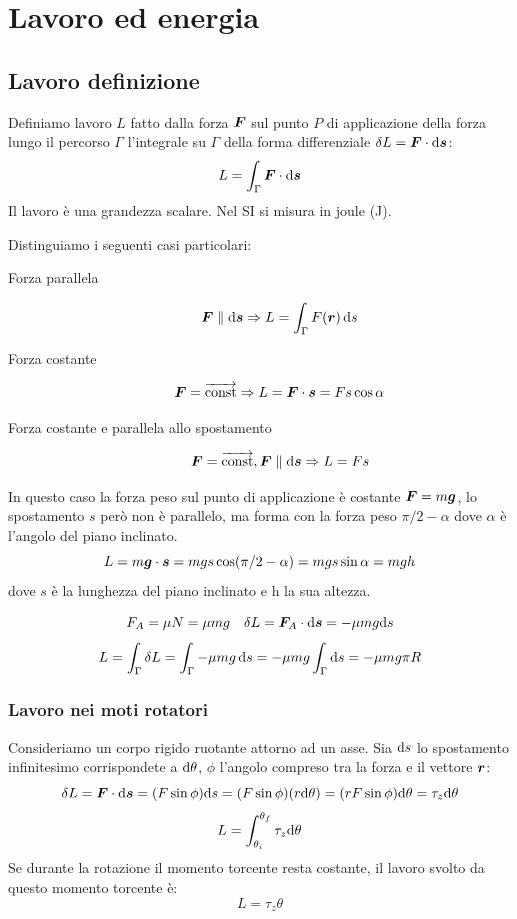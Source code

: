 \chapter{Lavoro ed energia}
\minitoc
\section{Lavoro definizione}
\begin{Def}[lavoro]
  Definiamo lavoro $L$ fatto dalla forza $\boldsymbol{F}$ sul punto $P$ di applicazione della forza lungo il percorso $\Gamma$ l'integrale su $\Gamma$ della forma differenziale $\delta L = \boldsymbol{F}\cdot\mathrm{d}\boldsymbol{s}$:
  \begin{equation}
    L=\int_\Gamma\boldsymbol{F}\cdot\mathrm{d} \boldsymbol{s}
  \end{equation}
  Il lavoro è una grandezza scalare. Nel SI si misura in joule (\si{\joule}).
\end{Def}
Distinguiamo i seguenti casi particolari:
\begin{description}
  \item[Forza parallela]
    \[\boldsymbol{F} \parallel \mathrm{d}\boldsymbol{s}\Rightarrow L=\int_\Gamma F(\boldsymbol{r})\,\mathrm{d} s\]
  \item[Forza costante]
    \[\boldsymbol{F} = \overrightarrow{\text{const}}\Rightarrow L=\boldsymbol{F} \cdot \boldsymbol{s} = Fs\cos\alpha\]
  \item[Forza costante e parallela allo spostamento]
    \[\boldsymbol{F} = \overrightarrow{\text{const}}, \boldsymbol{F} \parallel \mathrm{d}\boldsymbol{s}\Rightarrow L=Fs\]
\end{description}
\begin{Es}
  In questo caso la forza peso sul punto di applicazione è costante $\boldsymbol{F}=m\boldsymbol{g}$, lo spostamento $s$ però non è parallelo, ma forma con la forza peso $\pi/2 -\alpha$ dove $\alpha$ è l'angolo del piano inclinato.
  \[
    L = m\boldsymbol{g} \cdot \boldsymbol{s} = mgs\cos(\pi/2 - \alpha) = mgs\sin\alpha = mgh
  \]
  dove $s$ è la lunghezza del piano inclinato e h la sua altezza.
\end{Es}

\begin{Es}
  \[F_A=\mu N=\mu mg\quad \delta L=\boldsymbol{F}_A\cdot\mathrm{d} \boldsymbol{s}=-\mu mg\mathrm{d} s\]
  \[L=\int_\Gamma \delta L=\int_\Gamma -\mu mg\,\mathrm{d} s=-\mu mg\int_\Gamma\mathrm{d}
    s=-\mu mg\pi R\]
\end{Es}
\subsection{Lavoro nei moti rotatori}
Consideriamo un corpo rigido ruotante attorno ad un asse. Sia $\mathrm{d} s$ lo spostamento
infinitesimo corrispondete a $\mathrm{d} \theta$, $\phi$ l'angolo
compreso tra la forza e il vettore $\boldsymbol{r}$:
\[
  \delta L=\boldsymbol{F}\cdot\mathrm{d}\boldsymbol{s}=(F\sin \phi)\mathrm{d} s=(F \sin \phi)(r
  \mathrm{d}\theta)=(rF\sin\phi)\mathrm{d} \theta=\tau_z\mathrm{d}\theta
\]
\[L=\int_{\theta_i}^{\theta_f}\tau_z\mathrm{d}\theta\]
Se durante la rotazione il momento torcente resta costante, il
lavoro svolto da questo momento torcente è:
\[L=\tau_z\theta\]
